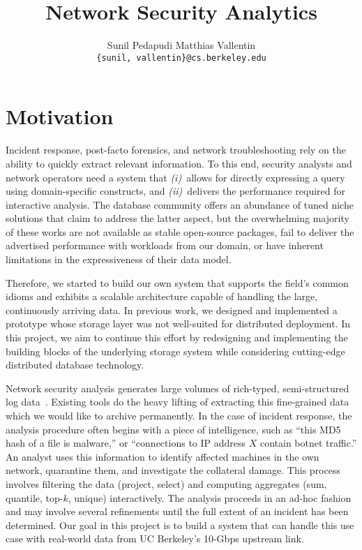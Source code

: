 \documentclass[11pt]{article}
\title{Network Security Analytics}
\author{Sunil Pedapudi \qquad Matthias Vallentin\\
\small \texttt{\{sunil, vallentin\}@cs.berkeley.edu}
}
\date{}
\def\first{\emph{(i)}~}
\def\second{\emph{(ii)}~}
\begin{document}
\maketitle

\section{Motivation}

Incident response, post-facto forensics, and network troubleshooting rely on
the ability to quickly extract relevant information. To this end, security
analysts and network operators need a system that \first allows for directly
expressing a query using domain-specific constructs, and \second delivers the
performance required for interactive analysis. The database community offers an
abundance of tuned niche solutions that claim to address the latter aspect, but
the overwhelming majority of these works are not available as stable
open-source packages, fail to deliver the advertised performance with workloads
from our domain, or have inherent limitations in the expressiveness of their
data model.

Therefore, we started to build our own system that supports the field's common
idioms and exhibits a scalable architecture capable of handling the large,
continuously arriving data. In previous work, we designed and implemented a
prototype whose storage layer was not well-suited for distributed deployment.
In this project, we aim to continue this effort by redesigning and
implementing the building blocks of the underlying storage system while
considering cutting-edge distributed database technology. 

Network security analysis generates large volumes of rich-typed,
semi-structured log data~\cite{Melnik10}. Existing tools do the heavy lifting
of extracting this fine-grained data~\cite{Paxson99} which we would like to
archive permanently. In the case of incident response, the analysis procedure
often begins with a piece of intelligence, such as ``this MD5 hash of a file is
malware,'' or ``connections to IP address $X$ contain botnet traffic.'' An
analyst uses this information to identify affected machines in the own network,
quarantine them, and investigate the collateral damage. This process involves
filtering the data (project, select) and computing aggregates (sum, quantile,
top-$k$, unique) interactively. The analysis proceeds in an ad-hoc fashion and
may involve several refinements until the full extent of an incident has been
determined. Our goal in this project is to build a system that can handle this
use case with real-world data from UC Berkeley's 10-Gbps upstream link.
\end{document}
